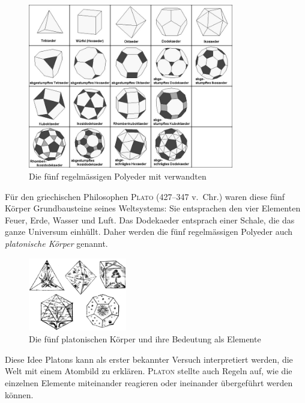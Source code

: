 \documentclass[%
11pt,%
twoside,%
titlepage,%
german,%
headsepline%
]{scrartcl}
\begin{document}
\begin{figure}[h!]
\begin{center}
\includegraphics[width=0.8\textwidth]{pictures/polyeders}
\end{center}
\caption{Die f\"unf regelm\"assigen Polyeder mit verwandten}
\end{figure}

F\"ur den griechischen Philosophen \textsc{Plato} (427--347 v.~Chr.) waren diese f\"unf K\"orper Grundbausteine seines Weltsystems: Sie entsprachen den vier Elementen Feuer, Erde, Wasser und Luft. Das Dodekaeder entsprach einer Schale, die das ganze Universum einh\"ullt. Daher werden die f\"unf regelm\"assigen Polyeder auch \emph{platonische K\"orper} genannt.

\begin{figure}[h!]
\begin{center}
\includegraphics[width=0.382\textwidth]{pictures/platonkoerper}
\end{center}
\caption{Die f\"unf platonischen K\"orper und ihre Bedeutung als Elemente}
\end{figure}

Diese Idee Platons kann als erster bekannter Versuch interpretiert werden, die Welt mit einem Atombild zu erkl\"aren. \textsc{Platon} stellte auch Regeln auf, wie die einzelnen Elemente miteinander reagieren oder ineinander \"ubergef\"uhrt werden k\"onnen.
\end{document}
